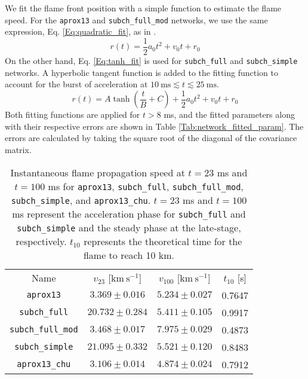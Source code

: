 \documentclass[preprint,times,tighten]{aastex631}
\begin{document}
We fit the flame front position with a simple function to estimate
the flame speed.  For the {\tt aprox13} and {\tt subch\_full\_mod} networks, we use the same expression, Eq. \ref{Eq:quadratic_fit}, 
as in \citet{harpole:2021}.
\begin{equation}\label{Eq:quadratic_fit}
    r(t) = \frac{1}{2}a_0 t^2 + v_0 t + r_0
\end{equation}
On the other hand, Eq. \ref{Eq:tanh_fit} is used for {\tt subch\_full} and {\tt subch\_simple} networks. A hyperbolic tangent function is added to the fitting function to account for the burst of acceleration at $10 \ \mbox{ms} \lesssim t \lesssim 25 \ \mbox{ms}$.
\begin{equation}\label{Eq:tanh_fit}
    r(t) = A\tanh{\left(\frac{t}{B} + C\right)} + \frac{1}{2}a_0 t^2 + v_0 t + r_0
\end{equation}
Both fitting functions are applied for $t > 8$ ms, and the fitted parameters along with their respective errors are shown in Table \ref{Tab:network_fitted_param}. The errors are calculated by taking the square root of the diagonal of the covariance matrix. 


\begin{table*}
\caption{\label{Tab:network_instan_vel}
Instantaneous flame propagation speed at $t = 23$ ms and $t = 100$ ms for {\tt aprox13}, {\tt subch\_full}, {\tt subch\_full\_mod}, {\tt subch\_simple}, and {\tt aprox13\_chu}. $t = 23$ ms and $t=100$ ms represent the acceleration phase for {\tt subch\_full} and {\tt subch\_simple} and the steady phase at the late-stage, respectively. $t_{10}$ represents the theoretical time for the flame to reach 10 km.
}

\begin{ruledtabular}
\footnotesize
\centering
\begin{tabular}{cccc}
\small 
Name &
$v_{23}$ [$\mbox{km} \ \mbox{s}^{-1}$] &
$v_{100}$ [$\mbox{km} \ \mbox{s}^{-1}$] &
$t_{10}$ [s]
\\
\colrule

{\tt aprox13} & $3.369 \pm 0.016$ & $5.234 \pm 0.027$ & 0.7647 \\
{\tt subch\_full} & $20.732 \pm 0.284$ & $5.411 \pm 0.105$ & 0.9917 \\
{\tt subch\_full\_mod} & $3.468 \pm 0.017$ & $7.975 \pm 0.029$ & 0.4873 \\
{\tt subch\_simple} & $21.095 \pm 0.332$ & $5.521 \pm 0.120$ & 0.8483 \\
{\tt aprox13\_chu} & $3.106 \pm 0.014$ & $4.874 \pm 0.024$ & 0.7912 \\
\end{tabular}
\end{ruledtabular}
\end{table*}
\end{document}
